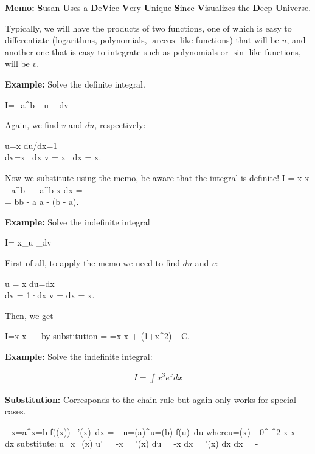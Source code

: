 {\bf Memo:} {\bf S}usan {\bf U}ses a {\bf D}e{\bf V}ice {\bf V}ery {\bf U}nique {\bf S}ince {\bf V}isualizes the {\bf D}eep {\bf U}niverse.

Typically, we will have the products of two functions, one of which is easy to differentiate (logarithms, polynomials, $\arccos$-like functions) that will be $u$, and another one that is easy to integrate
such as polynomials or $\sin$-like functions, will be $v$. 

{\bf Example:} Solve the definite integral.

\bnn
I=\int_a^b _{u}\, _{dv}
\enn

Again, we find $v$ and $du$, respectively:

\bnn
u=x \quad \rightarrow  du/dx=1 \\
dv=\cosh x \, dx \quad \rightarrow v = \int \cosh x \, dx = \sinh x.
\enn

Now we substitute using the memo, be aware that the integral is definite!
\bnn
I =  x \sinh x \arrowvert_a^b -  \int_a^b \sinh x dx = \\
  = b\sinh b - a \sinh a - (\cosh b - \cosh a).
\enn \svs

{\bf Example:} Solve the indefinite integral

\bnn
I=\int \underbrace{\arccot} x_{u} _{dv}
\enn

First of all, to apply the memo we need to find $du$ and $v$:

\bnn
u = \arccot x \quad \rightarrow du=dx\\
dv = 1·dx \quad \rightarrow v = \int dx = x.
\enn

Then, we get

\bnn
I=x \arccot x - _{by substitution} =
=x \arccot x + \log (1+x^2) +C.
\enn

{\bf Example:} Solve the indefinite integral:

\bnn
\begin{eqnarray}
I = \int x^3 e^x dx

\end{eqnarray}
\enn




{\bf Substitution:} Corresponds to the chain rule but again only works for special cases.

\bnn
\int_{x=a}^{x=b} f(\phi(x)) \, \phi'(x)\, dx = \int_{u=\phi(a)}^{u=\phi(b)} f(u)\, du \qquad \mbox{where}\qquad u=\phi(x)
\enn \vs
\bnn \int_0^{\pi} \cos^2 x \; \sin x \, dx \quad \mbox{substitute:} \quad u=\cos x=\phi(x) \enn \vs
\bnn
  u'==-\sin x = \phi'(x) \quad \rightarrow \quad
  du = -\sin x dx = \phi'(x) dx \quad \rightarrow\quad dx = -
\enn \vs

